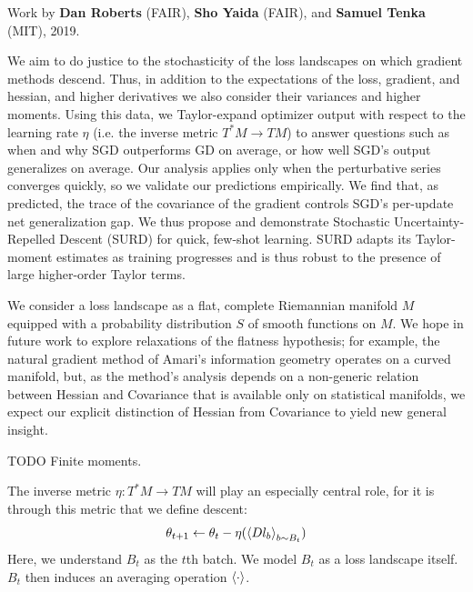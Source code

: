 \documentclass[12pt]{article}
\begin{document}

        Work by {\bf Dan Roberts} (FAIR), {\bf Sho Yaida} (FAIR), and {\bf Samuel Tenka} (MIT), 2019.

        We aim to do justice to the stochasticity of the loss landscapes on which gradient methods descend.  
        Thus, in addition to the expectations of the loss, gradient, and hessian, and higher derivatives we also
        consider their variances and higher moments.  Using this data, we Taylor-expand optimizer output with
        respect to the learning rate $\eta$ (i.e. the inverse metric $T^*M \to TM$) to answer questions such as 
        when and why SGD outperforms GD on average, or how well SGD's output generalizes on average.  Our analysis
        applies only when the perturbative series converges quickly, so we validate our predictions empirically.  
        We find that, as predicted, the trace of the covariance of the gradient controls SGD's per-update net
        generalization gap.  We thus propose and demonstrate Stochastic Uncertainty-Repelled Descent (SURD) for quick,
        few-shot learning.  SURD adapts its Taylor-moment estimates as training progresses and is thus robust to 
        the presence of large higher-order Taylor terms.

            We consider a loss landscape as a flat, complete Riemannian manifold $M$ equipped with a probability
            distribution $S$ of smooth functions on $M$.  We hope in future work to explore relaxations of the flatness
            hypothesis; for example, the natural gradient method of Amari's information geometry operates on 
            a curved manifold, but, as the method's analysis depends on a non-generic relation between Hessian and
            Covariance that is available only on statistical manifolds, we expect our explicit distinction of Hessian
            from Covariance to yield new general insight. 

            {\color{red} TODO Finite moments.}

            The inverse metric $\eta:T^*M \to TM$ will play an especially central role, for it is through this metric
            that we define descent:
            $$
                \theta_{t+1} \leftarrow \theta_t - \eta(\left\langle Dl_b \right\rangle_{b\sim B_t}) 
            $$
            Here, we understand $B_t$ as the $t$th batch.  We model $B_t$ as a loss landscape itself.
            $B_t$ then induces an averaging operation $\left\langle \cdot \right\rangle$.  
\end{document}
